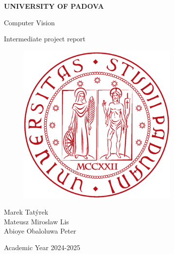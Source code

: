 \documentclass[english]{article}
\begin{document}
\begin{titlepage}

	\begin{center}
		\begin{Large} \textbf{UNIVERSITY OF PADOVA} \\
		\end{Large} \vspace{1cm}
		\vspace{3cm}
		\begin{Large} Computer Vision \end{Large}
		\par\end{center}

	\begin{center}
		\begin{Large}Intermediate project report\\
		\end{Large}
		\par\end{center}

	\begin{center}
		\vspace{2cm}
		\begin{figure}[!htb]
			\centering \includegraphics[width=8cm]{figures/unipd-logo.png}\\

		\end{figure}

		\par\end{center}

	\begin{center}
		\vspace{2cm}
		\begin{Large} Marek Tatýrek  \\
					Mateusz Miroslaw Lis   \\
					Abioye Obaloluwa Peter \\
		\end{Large} \vspace{2cm}
		\begin{Large} Academic Year 2024-2025 \end{Large}
		\par\end{center}
		
	\end{titlepage}
	
\end{document}
